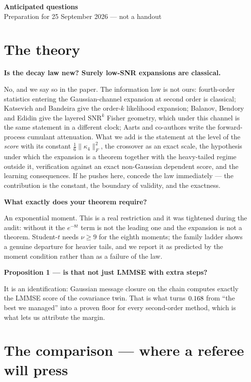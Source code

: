 \documentclass[10pt,a4paper]{article}
\newcommand{\Q}[1]{\par\medskip\noindent\textbf{#1}\par\nopagebreak\vspace{0.15em}\nopagebreak}
\begin{document}
\pagestyle{empty}

\begin{center}
{\Large\bfseries Anticipated questions}\\[0.2em]
{\normalsize Preparation for 25 September 2026 --- not a handout}
\end{center}

\section*{The theory}

\Q{Is the decay law new? Surely low-SNR expansions are classical.}
No, and we say so in the paper. The information law is not ours: fourth-order statistics entering
the Gaussian-channel expansion at second order is classical; Katsevich and Bandeira give the
order-$k$ likelihood expansion; Balanov, Bendory and Edidin give the layered
$\mathrm{SNR}^{k}$ Fisher geometry, which under this channel is the same statement in a different
clock; Aarts and co-authors write the forward-process cumulant attenuation. What we add is the
statement at the level of the \emph{score} with its constant $\tfrac16\|\kappa_4\|_F^2$, the
crossover as an exact scale, the hypothesis under which the expansion is a theorem together with
the heavy-tailed regime outside it, verification against an exact non-Gaussian dependent score, and
the learning consequences. If he pushes here, concede the law immediately --- the contribution is
the constant, the boundary of validity, and the exactness.

\Q{What exactly does your theorem require?}
An exponential moment. This is a real restriction and it was tightened during the audit: without
it the $e^{-8t}$ term is not the leading one and the expansion is not a theorem. Student-$t$ needs
$\nu\ge9$ for the eighth moments; the family ladder shows a genuine departure for heavier tails,
and we report it as predicted by the moment condition rather than as a failure of the law.

\Q{Proposition 1 --- is that not just LMMSE with extra steps?}
It is an identification: Gaussian message closure on the chain computes exactly the LMMSE score of
the covariance twin. That is what turns $0.168$ from ``the best we managed'' into a
proven floor for every second-order method, which is what lets us attribute the margin.

\section*{The comparison --- where a referee will press}
\end{document}
